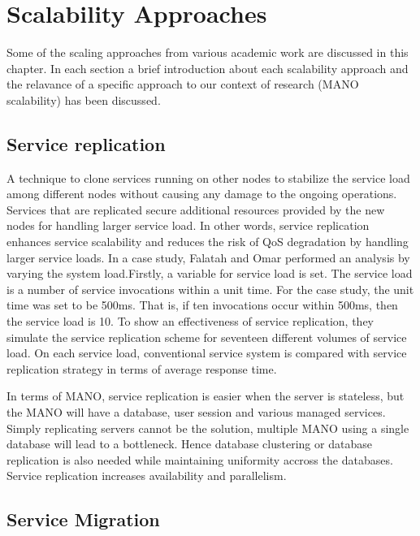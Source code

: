 \chapter{Scalability Approaches}
\label{ch:Scalability Approaches}

Some of the scaling approaches from various academic work are discussed in this chapter. In each section a brief introduction about each  scalability approach and the relavance of a specific approach to our context of research (MANO scalability) has been discussed.

\section{Service replication}

A technique to clone services running on other nodes to stabilize the service load among different nodes without causing any damage to the ongoing operations. Services that are replicated secure additional resources provided by the new nodes for handling larger service load. In other words, service replication enhances service scalability and reduces the risk of QoS degradation by handling larger service loads. In a case study, \cite{falatah_cloud_2014} Falatah and Omar performed an analysis by varying the system load.Firstly, a variable for service load is set. The service load is a number of service invocations within a unit time. For the case study, the unit time was set to be 500ms. That is, if ten invocations occur within 500ms, then the service load is 10. To show an effectiveness of service replication, they simulate the service replication scheme for seventeen different volumes of service load. On each service load, conventional service system is compared with service replication strategy in terms of average response time.

In terms of MANO, service replication is easier when the server is stateless, but the MANO will have a database, user session and various managed services. Simply replicating servers cannot be the solution, multiple MANO using a single database will lead to a bottleneck. Hence database clustering or database replication is also needed while maintaining uniformity accross the databases.  
Service replication increases availability and parallelism.


\section{Service Migration}

